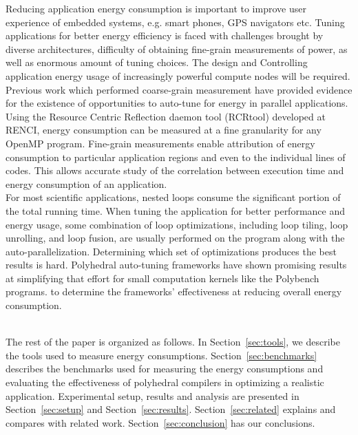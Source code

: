 Reducing application energy consumption is important to improve user experience of 
embedded systems, e.g. smart phones, GPS navigators etc. 
Tuning applications for better energy efficiency is faced with challenges brought by
diverse architectures, difficulty of obtaining fine-grain measurements of power, 
as well as enormous amount of tuning choices.
The design and 
Controlling application energy usage of increasingly powerful
compute nodes will be required. 
Previous work which performed coarse-grain measurement have provided evidence for the 
existence of opportunities to auto-tune for energy in parallel applications\cite{Tiwari:EnergyAutoTune}.
Using the Resource Centric Reflection daemon tool (RCRtool) developed at RENCI\cite{us}, 
energy 
consumption can be measured at a fine granularity for any OpenMP program. Fine-grain measurements
enable attribution of energy consumption to particular application regions and 
even to the individual lines of codes. This allows accurate study of the correlation between execution time
and energy consumption of an application. \\
For most scientific applications, nested loops consume the significant 
portion of the total running time. When tuning the application for
better performance and energy usage, some combination of loop optimizations, including loop 
tiling, loop unrolling, and loop fusion, are usually performed on the 
program along with the auto-parallelization.
Determining which set of optimizations produces the best results is hard.
Polyhedral auto-tuning frameworks have shown promising results at simplifying that effort\cite{EJ2011,EJ2012,EJ2013}
for small computation kernels like the Polybench programs\cite{Polybench}. 
to determine the frameworks' effectiveness at reducing overall energy consumption.
 
 \\
The rest of the paper is organized as follows. In Section~\ref{sec:tools}, we describe the tools
used to measure energy consumptions. Section~\ref{sec:benchmarks} describes the benchmarks used for  
measuring the energy consumptions and evaluating the effectiveness of polyhedral 
compilers in optimizing a realistic application. Experimental setup, results and analysis are presented in Section~\ref{sec:setup} and Section~\ref{sec:results}. 
Section~\ref{sec:related} explains and compares with related work. Section~\ref{sec:conclusion} has 
our conclusions.

